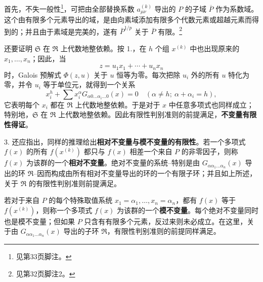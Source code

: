 首先，不失一般性\footnote{见第33页脚注。}，可把由全部替换系数 $a_{\mu\nu}^{(k)}$ 导出的 $P$ 的子域 $\overline P$ 作为系数域。这个由有限多个元素导出的域，是由向素域添加有限多个代数元素或超越元素而得到的；并且由于素域是完美的，遂有 $\overline P^{1/p}$ 关于 $\overline P$ 有限。\footnote{见第32页脚注2。}

还要证明 $\mathfrak S$ 在 $\mathfrak R$ 上代数地整依赖。按 1.，在 $h$ 个组 $x^{(k)}$ 中也出现原来的 $x_1,\ldots,x_n$；因此，当
\[
 z=u_1x_1+\cdots+u_nx_n
\]
时，Galois 预解式 $\Phi(z,u)$ 关于 $u$ 恒等为零。每次把除 $u_i$ 外的所有 $u$ 特化为零，并令 $u_i$ 等于单位元，就得到一个关系
\[
 x_i^h+\sum x_i^\alpha G_{\alpha0\ldots\alpha_i\ldots0}(x)=0
 \quad (\alpha\ne h;\ \alpha+\alpha_i=h),
\]
它表明每个 $x_i$ 都在 $\mathfrak R$ 上代数地整依赖。于是对于 $x$ 中任意多项式也同样成立；特别地，$\mathfrak S$ 在 $\mathfrak R$ 上代数地整依赖。因此有限性判别准则的前提满足，\textbf{不变量有限性得证}。

3. 还应指出，同样的推理给出\textbf{相对不变量与模不变量的有限性}。若一个多项式 $f(x)$ 的所有 $f(x^{(k)})$ 都只与 $f(x)$ 相差一个来自 $P$ 的非零因子，则称 $f(x)$ 为该群的一个\textbf{相对不变量}。绝对不变量的系统--特别是由 $G_{\alpha\alpha_1\ldots\alpha_n}(x)$ 导出的环 $\mathfrak R$--因而构成由所有相对不变量导出的环的一个有限子环；并且如上所述，关于 $\mathfrak R$ 的有限性判别准则前提满足。

若对于来自 $P$ 的每个特殊取值系统 $x_1=\alpha_1,\ldots,x_n=\alpha_n$，都有 $f(x)$ 等于 $f(x^{(k)})$，则称一个多项式 $f(x)$ 为该群的一个\textbf{模不变量}。每个绝对不变量同时也是模不变量；但如果 $P$ 只含有有限多个元素，反过来则未必成立。在这里，关于由 $G_{\alpha\alpha_1\ldots\alpha_n}(x)$ 导出的子环 $\mathfrak R$，有限性判别准则的前提同样满足。

\clearpage

